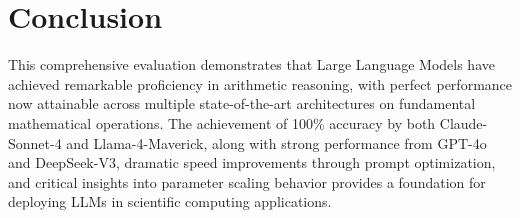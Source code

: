 \documentclass{article}
\begin{document}



\section{Conclusion}

This comprehensive evaluation demonstrates that Large Language Models have achieved remarkable proficiency in arithmetic reasoning, with perfect performance now attainable across multiple state-of-the-art architectures on fundamental mathematical operations. The achievement of 100\% accuracy by both Claude-Sonnet-4 and Llama-4-Maverick, along with strong performance from GPT-4o and DeepSeek-V3, dramatic speed improvements through prompt optimization, and critical insights into parameter scaling behavior provides a foundation for deploying LLMs in scientific computing applications.
\end{document}
